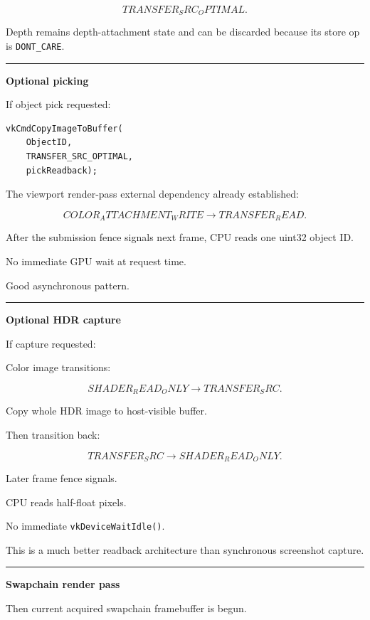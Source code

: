 \[
TRANSFER_SRC_OPTIMAL.
\]

Depth remains depth-attachment state and can be discarded because its store op is \texttt{DONT\_CARE}.

\begin{center}\rule{0.5\linewidth}{0.5pt}\end{center}

\textbf{Optional picking}

If object pick requested:

\begin{verbatim}
vkCmdCopyImageToBuffer(
    ObjectID,
    TRANSFER_SRC_OPTIMAL,
    pickReadback);
\end{verbatim}

The viewport render-pass external dependency already established:

\[
COLOR_ATTACHMENT_WRITE
\rightarrow
TRANSFER_READ.
\]

After the submission fence signals next frame, CPU reads one uint32 object ID.

No immediate GPU wait at request time.

Good asynchronous pattern.

\begin{center}\rule{0.5\linewidth}{0.5pt}\end{center}

\textbf{Optional HDR capture}

If capture requested:

Color image transitions:

\[
SHADER_READ_ONLY
\rightarrow
TRANSFER_SRC.
\]

Copy whole HDR image to host-visible buffer.

Then transition back:

\[
TRANSFER_SRC
\rightarrow
SHADER_READ_ONLY.
\]

Later frame fence signals.

CPU reads half-float pixels.

No immediate \texttt{vkDeviceWaitIdle()}.

This is a much better readback architecture than synchronous screenshot capture.

\begin{center}\rule{0.5\linewidth}{0.5pt}\end{center}

\textbf{Swapchain render pass}

Then current acquired swapchain framebuffer is begun.

